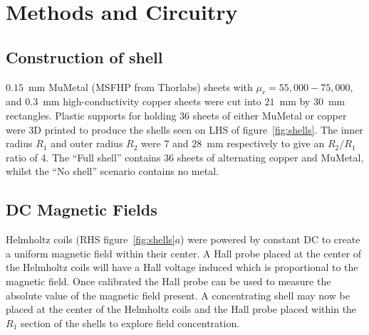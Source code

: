 \documentclass[11pt]{iopart}
\begin{document}
\section{Methods and Circuitry}

\subsection{Construction of shell}
$0.15$~mm MuMetal (MSFHP from Thorlabs) sheets with $\mu_r = 55,000 - 75,000$, and $0.3$~mm high-conductivity copper sheets were cut
into $21$~mm by $30$~mm rectangles.  Plastic supports for
holding $36$ sheets of either MuMetal or copper were 3D printed to
produce the shells seen on LHS of figure~\ref{fig:shells}. The inner radius
$R_1$ and outer radius $R_2$ were $7$ and $28$~mm respectively to give
an $R_2/R_1$ ratio of 4. The ``Full shell'' contains $36$ sheets of
alternating copper and MuMetal, whilst the ``No shell'' scenario
contains no metal. 

\subsection{DC Magnetic Fields}
Helmholtz coils (RHS figure~\ref{fig:shells}$a$) were powered by constant
DC to create a uniform magnetic field within their
center.
A Hall probe placed at the center of the Helmholtz coils will have a
Hall voltage induced which is proportional to the magnetic field. Once
calibrated the Hall probe can be used to measure the absolute value of
the magnetic field present. A concentrating shell may now be placed at
the center of the Helmholtz coils and the Hall probe placed within the
$R_1$ section of the shells to explore field concentration.

\end{document}
